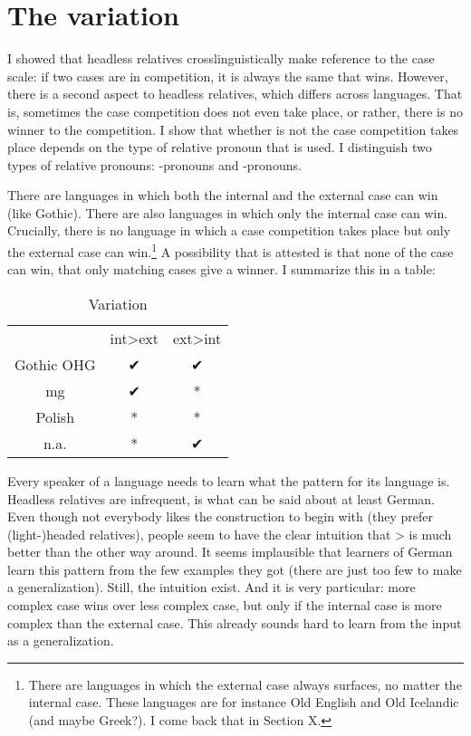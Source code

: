 
\chapter{The variation}

I showed that headless relatives crosslinguistically make reference to the case scale: if two cases are in competition, it is always the same that wins.
However, there is a second aspect to headless relatives, which differs across languages. That is, sometimes the case competition does not even take place, or rather, there is no winner to the competition. I show that whether is not the case competition takes place depends on the type of relative pronoun that is used. I distinguish two types of relative pronouns: -pronouns and -pronouns.

There are languages in which both the internal and the external case can win (like Gothic). There are also languages in which only the internal case can win. Crucially, there is no language in which a case competition takes place but only the external case can win.\footnote{
There are languages in which the external case always surfaces, no matter the internal case. These languages are for instance Old English and Old Icelandic (and maybe Greek?). I come back that in Section X.
} A possibility that is attested is that none of the case can win, that only matching cases give a winner. I summarize this in a table:

\begin{table}[H]
	\center
	\caption {Variation}
		\begin{tabular}{ccc}
		\toprule
		 					& \ac{int}>\ac{ext}		& \ac{ext}>\ac{int}	\\
								\cmidrule{2-3}
		Gothic OHG		&	✔										&	✔									\\
		\ac{mg} 	& ✔			 							&	*									\\
    Polish    & *                   & *                 \\
		n.a.    	& *										&	✔									\\
		\bottomrule
		\end{tabular}
\end{table}

Every speaker of a language needs to learn what the pattern for its language is. Headless relatives are infrequent, is what can be said about at least German. Even though not everybody likes the construction to begin with (they prefer (light-)headed relatives), people seem to have the clear intuition that > is much better than the other way around. It seems implausible that learners of German learn this pattern from the few examples they got (there are just too few to make a generalization). Still, the intuition exist. And it is very particular: more complex case wins over less complex case, but only if the internal case is more complex than the external case. This already sounds hard to learn from the input as a generalization.

